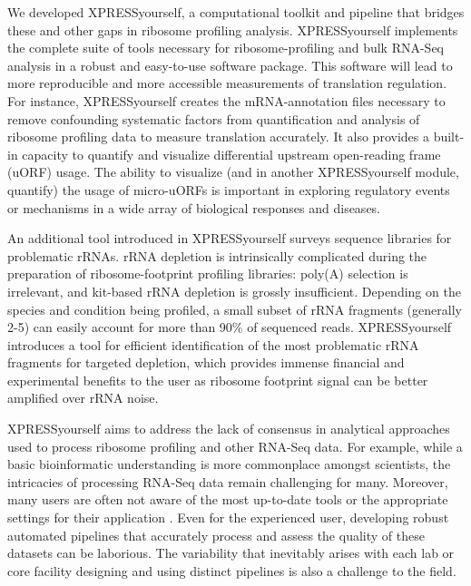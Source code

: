 \documentclass[10pt, oneside]{article}
\begin{document}
\begin{multicols}{2}
We developed XPRESSyourself, a computational toolkit and pipeline that bridges these and other gaps in ribosome profiling analysis. XPRESSyourself implements the complete suite of tools necessary for ribosome-profiling and bulk RNA-Seq analysis in a robust and easy-to-use software package. This software will lead to more reproducible and more accessible measurements of translation regulation. For instance, XPRESSyourself creates the mRNA-annotation files necessary to remove confounding systematic factors from quantification and analysis of ribosome profiling data to measure translation accurately. It also provides a built-in capacity to quantify and visualize differential upstream open-reading frame (uORF) usage. The ability to visualize (and in another XPRESSyourself module, quantify) the usage of micro-uORFs is important in exploring regulatory events or mechanisms in a wide array of biological responses and diseases. \par

An additional tool introduced in XPRESSyourself surveys sequence libraries for problematic rRNAs. rRNA depletion is intrinsically complicated during the preparation of ribosome-footprint profiling libraries: poly(A) selection is irrelevant, and kit-based rRNA depletion is grossly insufficient. Depending on the species and condition being profiled, a small subset of rRNA fragments (generally 2-5) can easily account for more than 90\% of sequenced reads. XPRESSyourself introduces a tool for efficient identification of the most problematic rRNA fragments for targeted depletion, which provides immense financial and experimental benefits to the user as ribosome footprint signal can be better amplified over rRNA noise. \par

XPRESSyourself aims to address the lack of consensus in analytical approaches used to process ribosome profiling and other RNA-Seq data. For example, while a basic bioinformatic understanding is more commonplace amongst scientists, the intricacies of processing RNA-Seq data remain challenging for many. Moreover, many users are often not aware of the most up-to-date tools or the appropriate settings for their application \cite{costello_npjsba, funari_science}. Even for the experienced user, developing robust automated pipelines that accurately process and assess the quality of these datasets can be laborious. The variability that inevitably arises with each lab or core facility designing and using distinct pipelines is also a challenge to the field. \par


\end{multicols}
\end{document}
